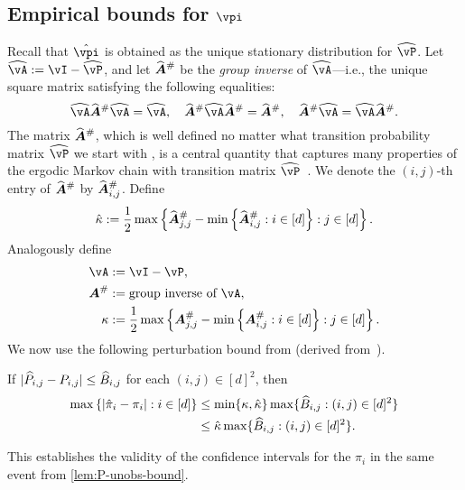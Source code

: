 \subsection{Empirical bounds for $\vpi$}

Recall that $\hat\vpi$ is obtained as the unique stationary
distribution for $\wh\vP$.
Let $\wh\vA := \vI - \wh\vP$, and let $\giAh$ be the \emph{group
inverse} of $\wh\vA$---i.e., the unique square matrix satisfying the
following equalities:
\[
  \wh\vA\giAh\wh\vA = \wh\vA , \quad
  \giAh\wh\vA\giAh = \giAh , \quad
  \giAh\wh\vA = \wh\vA\giAh .
\]
The matrix $\giAh$, which is well defined no matter what transition probability matrix $\wh\vP$ we start with 
\citep{meyer1975role},
 is a central quantity that captures many properties
of the ergodic Markov chain with transition matrix
$\wh\vP$~\citep{meyer1975role}.
We denote the $(i,j)$-th entry of $\giAh$ by $\giAh_{i,j}$.
Define
\begin{equation}
  \hat\kappa :=
  \frac12
  \max
  \Braces{
    \giAh_{j,j}
    - \min\Braces{ \giAh_{i,j} : i \in [d] }
    : j \in [d]
  } 
  .
  \notag
\end{equation}
Analogously define
\begin{align*}
  \vA & := \vI - \vP , \\
  \giA & := \text{group inverse of $\vA$} , \\
  \kappa & :=
  \frac12
  \max
  \Braces{
    \giA_{j,j}
    - \min\Braces{ \giA_{i,j} : i \in [d] }
    : j \in [d]
  } 
  .
\end{align*}
We now use the following perturbation bound from \citep[Section
3.3]{cho2001comparison} (derived
from~\citet{haviv1984perturbation,kirkland1998applications}).
\begin{lemma}
  \label{lem:pi-perturb}
  If
  $|\widehat{P}_{i,j} - P_{i,j}| \leq \widehat{B}_{i,j}$ for each $(i,j) \in
  [d]^2$, then
  \begin{align}
    \max\left\{
      |\hat\pi_i - \pi_i|
      : i \in [d]
    \right\}
    & \leq \min\{\kappa,\hat\kappa\} \max
    \{
      \widehat{B}_{i,j}
      : (i,j) \in [d]^2
    \}
    \notag \\
    & \leq \hat\kappa \max
    \{
      \widehat{B}_{i,j}
      : (i,j) \in [d]^2
    \}
    .
    \notag
  \end{align}
\end{lemma}
This establishes the validity of the confidence intervals for the
$\pi_i$ in the same event from \cref{lem:P-unobs-bound}.

